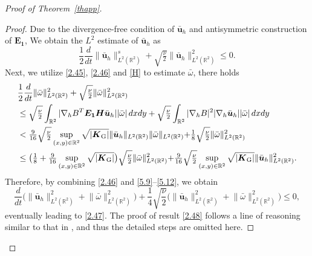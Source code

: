 \documentclass[pdflatex,sn-mathphys-num]{sn-jnl}%
\theoremstyle{thmstyleone}%
\theoremstyle{thmstyletwo}%
\theoremstyle{thmstylethree}%
\theoremstyle{thmstyletwo}
\begin{document}
\begin{proof}[Proof of Theorem~{\upshape\ref{thapp}}]
\begin{proof}
	Due to the divergence-free condition of $\bar{\boldsymbol{u}}_h$ and antisymmetric construction of $\boldsymbol{E_1}$, We obtain the $L^2$ estimate of $\bar {\boldsymbol u}_h$ as 
	\begin{equation}\label{5.9}
		\frac12\frac{d}{dt}\lVert\bar {\boldsymbol u}_h\rVert_{L^2(\mathbb{R}^2)}^s
		+ \sqrt{\tfrac{\nu}{2}}
		\lVert\bar {\boldsymbol u}_h\rVert_{{L}^2(\mathbb{R}^2)}^2
		\leq0.
	\end{equation}
	Next, we utilize \eqref{2.45}, \eqref{2.46} and \eqref{H}  to estimate $\bar{\omega}$, there holds
	\begin{align}\label{5.12}
		&	\frac12\frac{d}{dt}\lVert\bar{\omega}\rVert_{L^2(\mathbb{R}^2)}^2+\sqrt{\tfrac{\nu}{2}}\lVert\bar{\omega}\rVert_{L^2(\mathbb{R}^2)}^2\notag
		\\\notag
		&\leq\sqrt{\tfrac{\nu}{2}} \int_{\mathbb{R}^2} |\nabla_hB^T\boldsymbol{E_1} \boldsymbol{H}
		 \bar{\boldsymbol{u}}_h| |\bar{\omega}| \,dx{d}y 
		+\sqrt{\tfrac{\nu}{2}}
		 \int_{\mathbb{R}^2}
		 |\nabla_hB|^2|\nabla_h\bar{\boldsymbol{u}}_h||\bar{\omega}| \,dx{d}y 
		\\\notag
		&< 
		\tfrac{9}{16}\sqrt{\tfrac{\nu}{2}}
		\sup\limits_{(x,y)\in \mathbb{R}^2}\sqrt{|\boldsymbol{K}_{\mathrm{G}}|}
		\lVert\bar{\boldsymbol{u}}_h\lVert_{L^2(\mathbb{R}^2)}
		\lVert\bar{\omega}\lVert_{L^2(\mathbb{R}^2)}
		+\tfrac18\sqrt{\tfrac{\nu}{2}}
		\lVert\bar{\omega}\lVert^{2}_{L^2(\mathbb{R}^2)}
		\\ 
		&\leq
		\big(
		\tfrac18
		+\tfrac{9}{16}\sup\limits_{(x,y)\in \mathbb{R}^2}\sqrt{|\boldsymbol{K}_{\mathrm{G}}|}
		\big)\sqrt{\tfrac{\nu}{2}}
		\lVert\bar{\omega}\lVert^{2}_{L^2(\mathbb{R}^2)}
		+
		\tfrac{9}{16}\sqrt{\tfrac{\nu}{2}}
		\sup\limits_{(x,y)\in \mathbb{R}^2}\sqrt{|\boldsymbol{K}_{\mathrm{G}}|}
		\lVert\bar{\boldsymbol{u}}_h\lVert^2_{L^2(\mathbb{R}^2)}.
	\end{align}
	Therefore, by combining \eqref{2.46} and \eqref{5.9}--\eqref{5.12}, we obtain
	\begin{displaymath}
		 \frac{d}{dt}
		\big(\lVert\bar {\boldsymbol u}_h\rVert_{L^2(\mathbb{R}^2)}^2
		+\lVert\bar{\omega}\rVert_{L^2(\mathbb{R}^2)}^2\big)
		+ \frac14\sqrt{\frac{\nu}{2}}
		\big(\lVert\bar {\boldsymbol u}_h\rVert_{L^2(\mathbb{R}^2)}^2
		+\lVert\bar{\omega}\rVert_{L^2(\mathbb{R}^2)}^2\big)
		\leq0,
	\end{displaymath}
	eventually leading to \eqref{2.47}.
The proof of result \eqref{2.48} follows a line of reasoning similar to that in \cite{Jia2024}, and thus the detailed steps are omitted here.	
\end{proof}





\end{proof}
\end{document}
